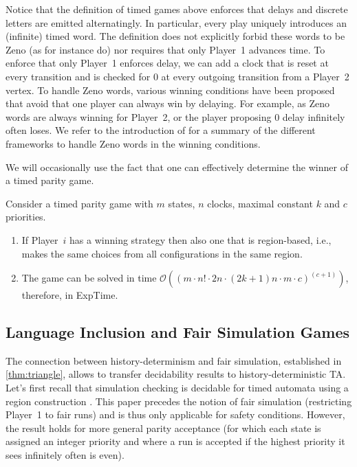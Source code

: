 \documentclass[10pt,a4paper]{amsart}
\theoremstyle{definition}
\numberwithin{equation}{section}
\newcommand{\exptime}{\EXPTIME}
\newcommand{\EXPTIME}{{\sc ExpTime}}
\begin{document}
\begin{remark}
    Notice that the definition of timed games above enforces that delays and discrete letters are emitted alternatingly. In particular, every play uniquely introduces an (infinite) timed word.
    The definition does not explicitly forbid these words to be Zeno (as for instance \cite{CHP08} do)
    nor requires that only Player~1 advances time.
    To enforce that only Player~1 enforces delay, we can add a clock that is reset at every transition and is checked for $0$ at every outgoing transition from a Player~2 vertex.    
    To handle Zeno words, various winning conditions have been proposed that avoid that one player can always win by delaying. For example, as Zeno words are always winning for Player~2, or the player proposing $0$ delay infinitely often loses. We refer to the introduction of \cite{DFHM03} for a summary of the different frameworks to handle Zeno words in the winning conditions.
    
\end{remark}

We will occasionally use the fact that one can effectively determine the winner of a timed parity game.

\begin{theorem}
    \label{lem:TPG}
    \label{lem:tg-region-strategies}
        Consider a timed parity game with $m$ states, $n$ clocks, maximal constant $k$ and $c$ priorities.
    \begin{enumerate}
        \item If Player~$i$ has a winning strategy then also one that is region-based, i.e., makes the same choices from all configurations in the same region.
        \item The game can be solved in time $\mathcal{O}((m\cdot n!\cdot 2n\cdot (2k+1)n\cdot m\cdot c)^{(c+1)})$, therefore, in \exptime.
    \end{enumerate}
\end{theorem}


\subsection{Language Inclusion and Fair Simulation Games}
The connection between history-determinism and fair simulation, established in \cref{thm:triangle},
allows to transfer decidability results to history-deterministic TA.
Let's first recall that simulation checking is decidable for timed automata using a region construction
\cite{TAKB96}.
This paper precedes the notion of fair simulation (restricting Player~1 to fair runs)
and is thus only applicable for safety conditions. However, the result holds for more general parity acceptance
(for which each state is assigned an integer priority and where a run is accepted if the highest priority it sees infinitely often is even).
\end{document}
